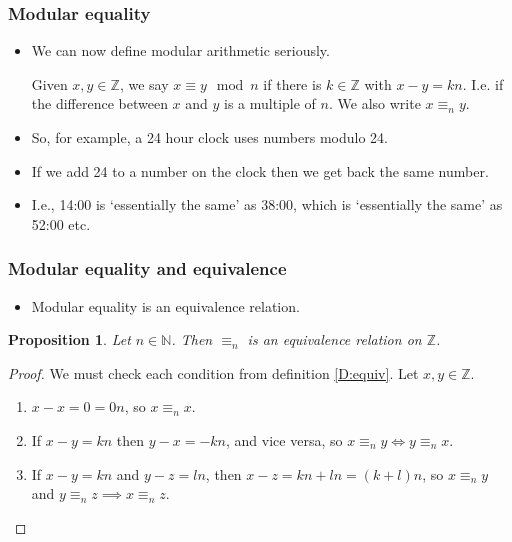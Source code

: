 \documentclass[handout]{beamer}
\newcommand{\bN}{\mathbb{N}}
\newcommand{\bZ}{\mathbb{Z}}
\newtheorem{proposition}[theorem]{Proposition}{\bfseries}{\itshape}
\begin{document}
\begin{frame}
\frametitle{Modular equality}
\begin{itemize}
\item We can now define modular arithmetic seriously.
\vspace{0.2cm}
\begin{definition}
Given $x,y\in \bZ$, we say $x \equiv y\mod n$ if there is $k\in\bZ$ with $x-y = kn$.\newline 
I.e. if the difference between $x$ and $y$ is a multiple of $n$. \newline We also write $x \equiv_n y$. 
\end{definition}
\vspace{0.2cm}
\item So, for example, a 24 hour clock uses numbers modulo 24. 
\vspace{0.2cm}
\item If we add 24 to a number on the clock then we get back the same number. 
\vspace{0.2cm}
\item I.e., 14:00 is `essentially the same' as 38:00, which is `essentially the same' as 52:00 etc. 
\end{itemize}
\end{frame}

\begin{frame}
\frametitle{Modular equality and equivalence}
\begin{itemize}
\item Modular equality is an equivalence relation.
\end{itemize}
\begin{proposition}\label{P:cong}
Let $n\in \bN$. Then $\equiv_n$ is an equivalence relation on $\bZ$.
\end{proposition}
\begin{proof}
We must check each condition from definition \ref{D:equiv}. Let $x,y\in\bZ$.
\begin{enumerate}
\item $x-x = 0 = 0n$, so $x\equiv_n x$.
\item If $x - y = kn$ then $y - x = -kn$, and vice versa, so $x\equiv_n y\iff y\equiv_n x$.
\item If $x-y = kn$ and $y-z = ln$, then $x - z= kn + ln = (k+l)n$, so $x\equiv_n y$ and $y\equiv_n z\implies x\equiv_n z$.
\end{enumerate}
\end{proof}
\end{frame}
\end{document}
